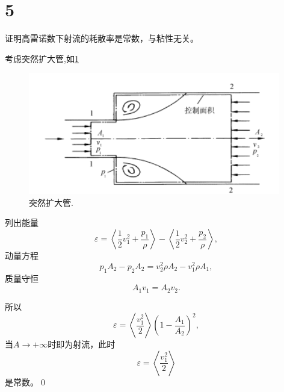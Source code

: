 \documentclass[12pt]{ctexart}
\begin{document}
\section{5}

证明高雷诺数下射流的耗散率是常数，与粘性无关。

考虑突然扩大管,如\cref{fig:5kuo}
\begin{figure}[htp]
	\centering
	\includegraphics[width=11cm]{kuo.png}
	\caption{突然扩大管.}
	\label{fig:5kuo}
\end{figure}
列出能量
\begin{equation}
	\varepsilon = \left\langle \frac{1}{2} v_1^2 + \frac{p_1}{\rho}\right\rangle - \left\langle \frac{1}{2} v_2^2 + \frac{p_2}{\rho} \right\rangle,
\end{equation}
动量方程
\begin{equation}
	p_1 A_2 - p_2 A_2 = v_2^2 \rho A_2 - v_1^2 \rho A_1,
\end{equation}
质量守恒
\begin{equation}
	A_1 v_1 = A_2 v_2.
\end{equation}

所以
\begin{equation}
	\varepsilon = \left\langle \frac{v_1^2}{2}\right\rangle \left(1-\frac{A_1}{A_2}\right)^2,
\end{equation}
当$A\to +\infty$时即为射流，此时
\begin{equation}
	\varepsilon = \left\langle \frac{v_1^2}{2}\right\rangle
\end{equation}
是常数。\qed









\nocite{*}


\end{document}

